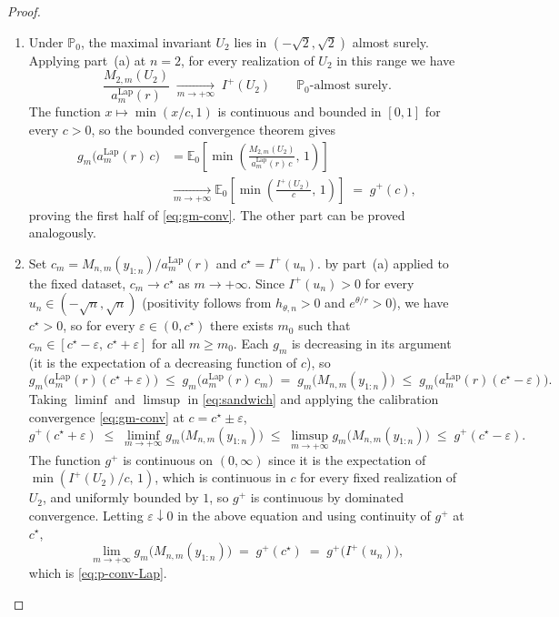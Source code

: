 \documentclass[12pt, a4paper]{report}
\newcommand{\E}{\mathbb{E}}
\newcommand{\Lap}{\mathrm{Lap}}
\newcommand{\1}{\mathbf{1}}
\begin{document}
\begin{proof}
\begin{enumerate}
\item[(b)] Under $\mathbb{P}_0$, the maximal invariant $U_2$ lies in $(-\sqrt 2,\sqrt 2)$
almost surely. Applying part~(a) at $n=2$, for every realization of
$U_2$ in this range we have
\begin{equation}\label{eq:M2-conv-as}
  \frac{M_{2,m}(U_2)}{a_m^{\Lap}(r)}
  \;\xrightarrow[m\to+\infty]{}\; I^+(U_2)
  \qquad \mathbb{P}_0\text{-almost surely.}
\end{equation}
The function $x\mapsto\min(x/c,1)$ is continuous and bounded in
$[0,1]$ for every $c>0$, so the bounded convergence theorem gives
\begin{align*}
  g_m\!\bigl(a_m^{\Lap}(r)\,c\bigr)
  &= \E_0\!\left[\min\!\left(\frac{M_{2,m}(U_2)}{a_m^{\Lap}(r)\,c},\,1\right)\right] \\
  &\xrightarrow[m\to+\infty]{}
  \E_0\!\left[\min\!\left(\frac{I^+(U_2)}{c},\,1\right)\right]
  \;=\; g^+(c),
\end{align*}
proving the first half of \eqref{eq:gm-conv}. The other part can be proved analogously.

\item[(c)] Set $c_m = M_{n,m}(y_{1:n})/a_m^{\Lap}(r)$ and $c^\star = I^+(u_n)$.
by part~(a) applied to the fixed dataset, $c_m\to c^\star$ as
$m\to+\infty$. Since $I^+(u_n)>0$ for every $u_n\in(-\sqrt n,\sqrt n)$
(positivity follows from $h_{\theta,n}>0$ and $e^{\theta/r}>0$), we
have $c^\star>0$, so for every $\varepsilon\in(0,c^\star)$ there exists
$m_0$ such that $c_m\in[c^\star-\varepsilon,\,c^\star+\varepsilon]$
for all $m\geq m_0$. Each $g_m$ is decreasing in its argument (it is
the expectation of a decreasing function of $c$), so
\begin{equation}\label{eq:sandwich}
  g_m\!\bigl(a_m^{\Lap}(r)(c^\star+\varepsilon)\bigr)
  \;\leq\; g_m\!\bigl(a_m^{\Lap}(r)\,c_m\bigr)
  \;=\; g_m\!\bigl(M_{n,m}(y_{1:n})\bigr)
  \;\leq\; g_m\!\bigl(a_m^{\Lap}(r)(c^\star-\varepsilon)\bigr).
\end{equation}
Taking $\liminf$ and $\limsup$ in \eqref{eq:sandwich} and applying the
calibration convergence \eqref{eq:gm-conv} at $c = c^\star\pm\varepsilon$,
\[
  g^+(c^\star+\varepsilon)
  \;\leq\; \liminf_{m\to+\infty} g_m\!\bigl(M_{n,m}(y_{1:n})\bigr)
  \;\leq\; \limsup_{m\to+\infty} g_m\!\bigl(M_{n,m}(y_{1:n})\bigr)
  \;\leq\; g^+(c^\star-\varepsilon).
\]
The function $g^+$ is continuous on $(0,\infty)$ since it is the expectation of $\min(I^+(U_2)/c,\,1)$, which is continuous in $c$ for
every fixed realization of $U_2$, and uniformly bounded by $1$, so $g^+$ is continuous by dominated convergence. Letting $\varepsilon\downarrow 0$ in the above equation and using continuity of $g^+$ at $c^\star$,
\[
  \lim_{m\to+\infty} g_m\!\bigl(M_{n,m}(y_{1:n})\bigr) \;=\; g^+(c^\star)
  \;=\; g^+\!\bigl(I^+(u_n)\bigr),
\]
which is \eqref{eq:p-conv-Lap}.
\end{enumerate}
\end{proof}
\end{document}
